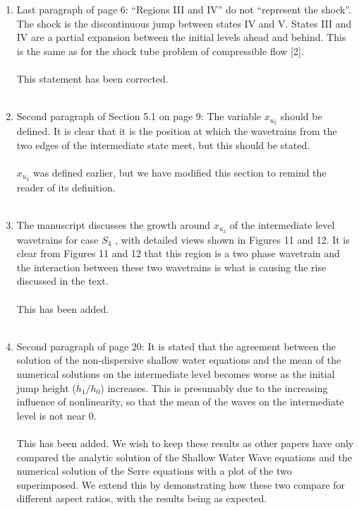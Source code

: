 \documentclass[times]{article}
\begin{document}
	\begin{enumerate}
		\item Last paragraph of page 6: “Regions III and IV” do not “represent the shock”. The	shock is the discontinuous jump between states IV and V. States III and IV are a partial expansion between the initial levels ahead and behind. This is the same as for the shock tube problem of compressible flow [2]. \\ \\
		{\color{blue} This statement has been corrected.} \\ \\

		\item Second paragraph of Section 5.1 on page 9: The variable $x_{u_2}$ should be defined. It is clear that it is the position at which the wavetrains from the two edges of the intermediate state meet, but this should be stated. \\ \\
		{\color{blue} $x_{u_2}$ was defined earlier, but we have modified this section to remind the reader of its definition.} \\ \\
		
		
		\item The manuscript discusses the growth around $x_{u_2}$ of the intermediate level wavetrains for case $S_4$ , with detailed views shown in Figures 11 and 12. It is clear from Figures 11 and 12 that this region is a two phase wavetrain and the interaction between these two wavetrains is what is causing the rise discussed in the text.
		\\ \\
		{\color{blue} This has been added.} \\ \\
		 
		\item Second paragraph of page 20: It is stated that the agreement between the solution of the non-dispersive shallow water equations and the mean of the numerical solutions on the intermediate level becomes worse as the initial jump height ($h_1/h_0$) increases. This is presumably due to the increasing influence of nonlinearity, so that the mean of the waves on the intermediate level is not near 0.  \\ \\
		{\color{blue} This has been added. We wish to keep these results as other papers have only compared the analytic solution of the Shallow Water Wave equations and the numerical solution of the Serre equations with a plot of the two superimposed. We extend this by demonstrating how these two compare for different aspect ratios, with the results being as expected.} \\ \\
		

\end{enumerate}
\end{document}
